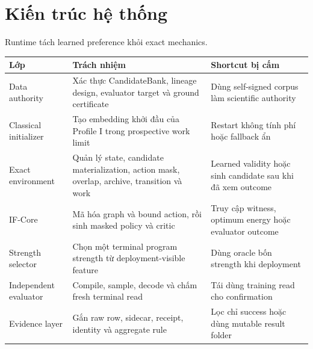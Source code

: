 \documentclass[
  vietnamese,
  10pt,
  a4paper,
]{article}
\begin{document}
\section{Kiến trúc hệ thống}\label{kiux1ebfn-truxfac-hux1ec7-thux1ed1ng}

Runtime tách learned preference khỏi exact mechanics.

\begin{longtable}[]{@{}
  >{\raggedright\arraybackslash}p{}
  >{\raggedright\arraybackslash}p{}
  >{\raggedright\arraybackslash}p{}@{}}
\toprule\noalign{}
\begin{minipage}[b]{\linewidth}\raggedright
Lớp
\end{minipage} & \begin{minipage}[b]{\linewidth}\raggedright
Trách nhiệm
\end{minipage} & \begin{minipage}[b]{\linewidth}\raggedright
Shortcut bị cấm
\end{minipage} \\
\midrule\noalign{}
\endhead
\bottomrule\noalign{}
\endlastfoot
Data authority & Xác thực CandidateBank, lineage design, evaluator
target và ground certificate & Dùng self-signed corpus làm scientific
authority \\
Classical initializer & Tạo embedding khởi đầu của Profile I trong
prospective work limit & Restart không tính phí hoặc fallback ẩn \\
Exact environment & Quản lý state, candidate materialization, action
mask, overlap, archive, transition và work & Learned validity hoặc sinh
candidate sau khi đã xem outcome \\
IF-Core & Mã hóa graph và bound action, rồi sinh masked policy và critic
& Truy cập witness, optimum energy hoặc evaluator outcome \\
Strength selector & Chọn một terminal program strength từ
deployment-visible feature & Dùng oracle bốn strength khi deployment \\
Independent evaluator & Compile, sample, decode và chấm fresh terminal
read & Tái dùng training read cho confirmation \\
Evidence layer & Gắn raw row, sidecar, receipt, identity và aggregate
rule & Lọc chỉ success hoặc dùng mutable result folder \\
\end{longtable}
\end{document}
